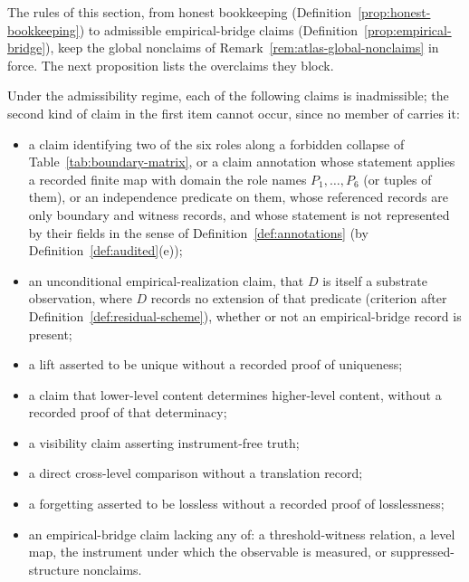 The rules of this section, from honest bookkeeping
(Definition~\ref{prop:honest-bookkeeping}) to admissible empirical-bridge
claims (Definition~\ref{prop:empirical-bridge}), keep the global
nonclaims of Remark~\ref{rem:atlas-global-nonclaims} in force. The next
proposition lists the overclaims they block.

\begin{proposition}\label{prop:nonclaim-closure}
Under the admissibility regime, each of the following claims is
inadmissible; the second kind of claim in the first item cannot occur, since
no member of \FATCD{} carries it:
\begin{itemize}[topsep=2pt,itemsep=1pt]
  \item a claim identifying two of the six roles along a forbidden collapse
    of Table~\ref{tab:boundary-matrix}, or a claim annotation whose statement applies
    a recorded finite map with domain the role names \(P_1,\dots,P_6\) (or
    tuples of them), or an independence predicate on them, whose referenced
    records are only boundary and witness records, and whose statement is not
    represented by their fields in the sense of
    Definition~\ref{def:annotations} (by Definition~\ref{def:audited}(e));
  \item an unconditional empirical-realization claim, that \(D\) is itself a
    substrate observation, where \(D\) records no extension of that
    predicate (criterion after Definition~\ref{def:residual-scheme}), whether
    or not an empirical-bridge record is present;
  \item a lift asserted to be unique without a recorded proof of uniqueness;
  \item a claim that lower-level content determines higher-level content,
    without a recorded proof of that determinacy;
  \item a visibility claim asserting instrument-free truth;
  \item a direct cross-level comparison without a translation record;
  \item a forgetting asserted to be lossless without a recorded proof of
    losslessness;
  \item an empirical-bridge claim lacking any of: a threshold-witness
    relation, a level map, the instrument under which the observable is
    measured, or suppressed-structure nonclaims.
\end{itemize}
\end{proposition}

